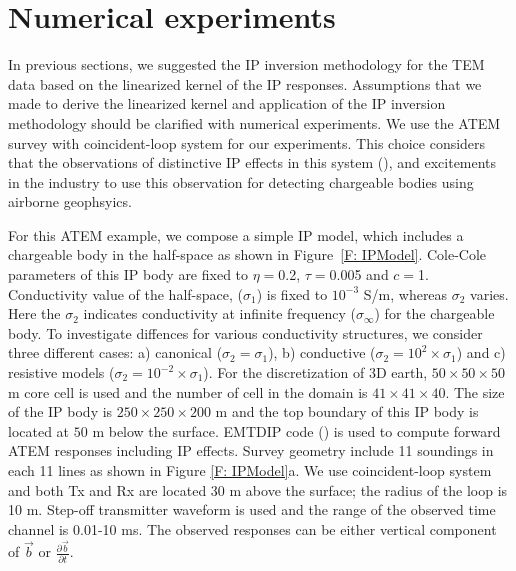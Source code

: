 \documentclass[a4paper, 11pt]{article}
\newcommand{\siginf}{\sigma_\infty}
\renewcommand {\b}  { {\vec b} }
\begin{document}

\section{Numerical experiments}
\label{section: numerical_examples}
In previous sections, we suggested the IP inversion methodology for the TEM data based on the linearized kernel of the IP responses. 
Assumptions that we made to derive the linearized kernel and application of the IP inversion methodology should be clarified with numerical experiments. 
We use the ATEM survey with coincident-loop system for our experiments. 
This choice considers that the observations of distinctive IP effects in this system (\cite{Kratzer2012,Kang2015a,Kang2015b,Doug2015}), and excitements in the industry to use this observation for detecting chargeable bodies using airborne geophsyics. 

For this ATEM example, we compose a simple IP model, which includes a chargeable body in the half-space as shown in Figure~\ref{F: IPModel}.
Cole-Cole parameters of this IP body are fixed to $\eta=$0.2, $\tau=$0.005 and $c=$1.
Conductivity value of the half-space, ($\sigma_1$) is fixed to $10^{-3}$ S/m, whereas $\sigma_2$ varies. 
Here the $\sigma_2$ indicates conductivity at infinite frequency ($\siginf$) for the chargeable body. 
To investigate diffences for various conductivity structures, we consider three different cases: a) canonical ($\sigma_2=\sigma_1$), b) conductive ($\sigma_2=10^2\times\sigma_1$) and c) resistive models ($\sigma_2=10^{-2}\times\sigma_1$).
For the discretization of 3D earth, $50\times50\times50$ m core cell is used and the number of cell in the domain is $41\times41\times40$.
The size of the IP body is $250\times250\times200$ m and the top boundary of this IP body is located at $50$ m below the surface.
EMTDIP code (\cite{Marchant2014}) is used to compute forward ATEM responses including IP effects. 
Survey geometry include 11 soundings in each 11 lines as shown in Figure \ref{F: IPModel}a.
We use coincident-loop system and both Tx and Rx are located 30 m above the surface; the radius of the loop is 10 m.
Step-off transmitter waveform is used and the range of the observed time channel is 0.01-10 ms.
The observed responses can be either vertical component of $\b$ or $\frac{\partial \b}{\partial t}$.
\end{document}
